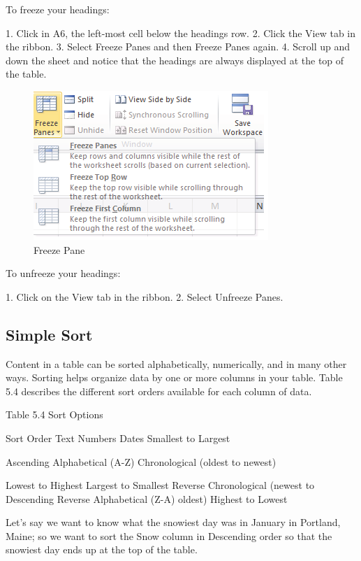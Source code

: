 To freeze your headings:

1.   Click in A6, the left-most cell below the headings row.
2.   Click the View tab in the ribbon.
3.   Select Freeze Panes and then Freeze Panes again.
4.   Scroll up and down the sheet and notice that the headings are always displayed at the top of the
table.

\begin{figure}[H]
	\centering
	\includegraphics[width=\maxwidth{.95\linewidth}]{gfx/ch05_fig07}
	\caption{Freeze Pane}
	\label{05:fig07}
\end{figure}






To unfreeze your headings:

1. Click on the View tab in the ribbon.
2. Select Unfreeze Panes.

\subsection{Simple Sort}

Content in a table can be sorted alphabetically, numerically, and in many other ways. Sorting helps
organize data by one or more columns in your table. Table 5.4 describes the different sort orders
available for each column of data.

Table 5.4 Sort Options

Sort Order     Text                     Numbers               Dates
Smallest to Largest

Ascending      Alphabetical (A-Z)                             Chronological (oldest to newest)

Lowest to Highest
Largest to Smallest
Reverse Chronological (newest to
Descending Reverse Alphabetical (Z-A)
oldest)
Highest to Lowest


Let’s say we want to know what the snowiest day was in January in Portland, Maine; so we want to
sort the Snow column in Descending order so that the snowiest day ends up at the top of the table.

